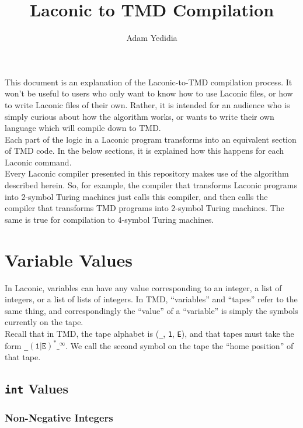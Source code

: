 \documentclass[11pt]{article}
\title{Laconic to TMD Compilation}
\author{Adam Yedidia}
\begin{document}
    
\maketitle

This document is an explanation of the Laconic-to-TMD compilation process. It won't be useful to users who only want to know how to use Laconic files, or how to write Laconic files of their own. Rather, it is intended for an audience who is simply curious about how the algorithm works, or wants to write their own language which will compile down to TMD. \\

Each part of the logic in a Laconic program transforms into an equivalent section of TMD code. In the below sections, it is explained how this happens for each Laconic command. \\

Every Laconic compiler presented in this repository makes use of the algorithm described herein. So, for example, the compiler that transforms Laconic programs into 2-symbol Turing machines just calls this compiler, and then calls the compiler that transforms TMD programs into 2-symbol Turing machines. The same is true for compilation to 4-symbol Turing machines.

\section{Variable Values} \label{sec:varvalues}

In Laconic, variables can have any value corresponding to an integer, a list of integers, or a list of lists of integers. In TMD, ``variables'' and ``tapes'' refer to the same thing, and correspondingly the ``value'' of a ``variable'' is simply the symbols currently on the tape. \\

Recall that in TMD, the tape alphabet is (\texttt{_}, \texttt{1}, \texttt{E}), and that tapes must take the form \texttt{_}$(\texttt{1}|\texttt{E})^*\texttt{_}^\infty$. We call the second symbol on the tape the ``home position'' of that tape.

\subsection{\texttt{int} Values}

\subsubsection{Non-Negative Integers}
\end{document}
